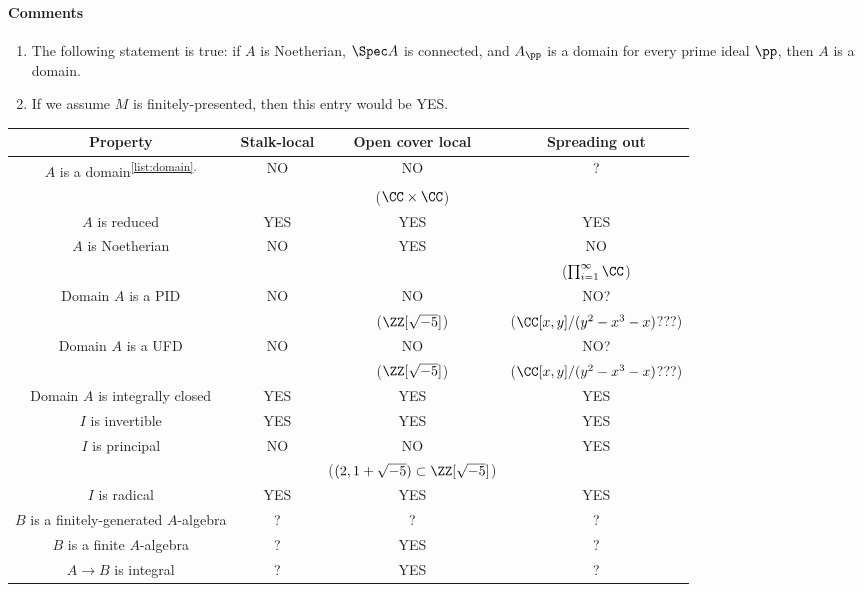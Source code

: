\paragraph{Comments}
\begin{enumerate}
    \item The following statement is true:
    if $A$ is Noetherian, $\Spec A$ is connected,
    and $A_\pp$ is a domain for every prime ideal $\pp$,
    then $A$ is a domain.
    \label{list:domain}
    \item If we assume $M$ is finitely-presented,
    then this entry would be YES.
    \label{list:free}
\end{enumerate}
\begin{table}
\begin{tabular}{c|ccc}
    \def\arraystretch{1.25}
    Property & Stalk-local & Open cover local & Spreading out \\ \hline
    $A$ is a domain\textsuperscript{\ref{list:domain}.} 
    & NO & NO & ? \\
    & & {\footnotesize($\CC\times\CC$)} 
    &\\
    $A$ is reduced & YES & YES & YES \\
    $A$ is Noetherian & NO & YES & NO \\
    & & & {\footnotesize($\prod_{i=1}^\infty\CC$)}  \\ \hline 
    Domain $A$ is a PID & NO  & NO & NO? \\
    & & {\footnotesize($\ZZ[\sqrt{-5}]$)} 
    & {\footnotesize($\CC[x,y]/(y^2-x^3-x)$???)}\\
    Domain $A$ is a UFD  &NO  & NO & NO? \\
    & & {\footnotesize($\ZZ[\sqrt{-5}]$)} 
    & {\footnotesize($\CC[x,y]/(y^2-x^3-x)$???)} \\
    Domain $A$ is integrally closed 
    & YES & YES & YES \\ \hline 
    $I$ is invertible & YES & YES & YES \\ 
    $I$ is principal & NO & NO & YES \\
    & & {\footnotesize($(2,1+\sqrt{-5})\subset \ZZ[\sqrt{-5}]$)} \\
    $I$ is radical & YES & YES & YES \\
    \hline 
    $B$ is a finitely-generated
    $A$-algebra & ? & ? & ? \\
    $B$ is a finite $A$-algebra & ? & YES & ? \\
    $A\to B$ is integral & ? & YES & ?  \\ \hline

\end{tabular}
\end{table}
